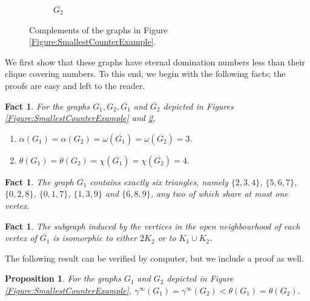 \documentclass[11pt]{article}
\newtheorem{prop}[thm]{Proposition}
\newtheorem{fact}[thm]{Fact}
\begin{document}
\begin{figure}[h!]
\begin{subfigure}[b]{0.45\textwidth}
			\caption{$\overline{G_2}$}
			\label{Figure:G2Complement}	
		\end{subfigure}
		\caption{Complements of the graphs in Figure \ref{Figure:SmallestCounterExample}.}
		\label{Figure:SmallestComplement}
	\end{figure}
	
	We first show that these graphs have eternal domination numbers less than their clique covering numbers. To this end, we begin with the following facts; the proofs are easy and left to the reader. 
	
	\begin{fact} \label{Fact:IndependenceCliqueCovering}
		For the graphs $G_1, G_2, \overline{G_1}$ and $\overline{G_2}$ depicted in Figures \ref{Figure:SmallestCounterExample} and \ref{Figure:SmallestComplement},
		\begin{enumerate} [label=(\alph*)]
			\item $\alpha(G_1)=\alpha(G_2)=\omega(\overline{G_1})=\omega(\overline{G_2})=3$.
			\item $\theta(G_1)=\theta(G_2)=\chi(\overline{G_1})=\chi(\overline{G_2})=4$.
		\end{enumerate}
	\end{fact}
	
	\begin{fact} \label{Fact:Triangles}
		The graph $\overline{G_1}$ contains exactly six triangles, namely $\{2, 3, 4\}$, $\{5, 6, 7\}$, $\{0, 2, 8\}$, $\{0, 1, 7\}$, $\{1, 3, 9\}$ and $\{6, 8, 9\}$, any two of which share at most one vertex.
	\end{fact}
	
	\begin{fact} \label{Fact:Neighbourhood}
		The subgraph induced by the vertices in the open neighbourhood of each vertex of $\overline{G_1}$ is isomorphic to either $2 K_2$ or to $K_1 \cup K_2$.
	\end{fact}
	
	The following result can be verified by computer, but we include a proof as well.
	
	\begin{prop} \label{Proposition:SmallestGraph}
		For the graphs $G_1$ and $G_2$ depicted in Figure \ref{Figure:SmallestCounterExample}, $\gamma^\infty(G_1)=\gamma^\infty(G_2)<\theta(G_1)=\theta(G_2)$.
	\end{prop}
	
\end{document}
